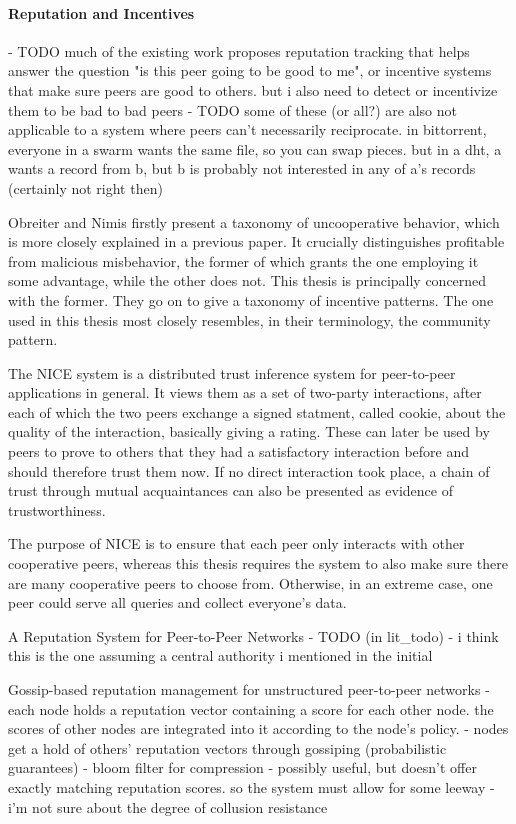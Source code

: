 \paragraph{Reputation and Incentives}
- TODO much of the existing work proposes reputation tracking that helps answer
  the question "is this peer going to be good to me", or incentive systems that
  make sure peers are good to others. but i also need to detect or incentivize
  them to be bad to bad peers
- TODO some of these (or all?) are also not applicable to a system where peers
  can't necessarily reciprocate. in bittorrent, everyone in a swarm wants the
  same file, so you can swap pieces. but in a dht, a wants a record from b, but
  b is probably not interested in any of a's records (certainly not right then)

Obreiter and Nimis\cite{obreiter2003taxonomy} firstly present a taxonomy of
uncooperative behavior, which is more closely explained in a previous
paper\cite{obreiter2003stimulating}. It crucially distinguishes profitable from
malicious misbehavior, the former of which grants the one employing it some
advantage, while the other does not. This thesis is principally concerned with
the former. They go on to give a taxonomy of incentive patterns. The one used in
this thesis most closely resembles, in their
terminology, the community pattern.

The NICE system\cite{sherwood2006cooperative} is a distributed trust inference
system for peer-to-peer applications in general. It views them as a set of
two-party interactions, after each of which the two peers exchange a signed
statment, called cookie, about the quality of the interaction, basically giving
a rating. These can later be used by peers to prove to others that they had a
satisfactory interaction before and should therefore trust them now. If no
direct interaction took place, a chain of trust through mutual acquaintances can
also be presented as evidence of trustworthiness.

The purpose of NICE is to ensure that each peer only interacts with other
cooperative peers, whereas this thesis requires the system to also make sure
there are many cooperative peers to choose from. Otherwise, in an extreme case,
one peer could serve all queries and collect everyone's data.

\cite{gupta2003reputation}
A Reputation System for Peer-to-Peer Networks
- TODO (in lit\_todo)
- i think this is the one assuming a central authority i mentioned in the
  initial

\cite{zhou2007gossip}
Gossip-based reputation management for unstructured peer-to-peer networks
- each node holds a reputation vector containing a score for each other node.
  the scores of other nodes are integrated into it according to the node's
  policy.
- nodes get a hold of others' reputation vectors through gossiping
  (probabilistic guarantees)
- bloom filter for compression
- possibly useful, but doesn't offer exactly matching reputation scores. so the
  system must allow for some leeway
- i'm not sure about the degree of collusion resistance

